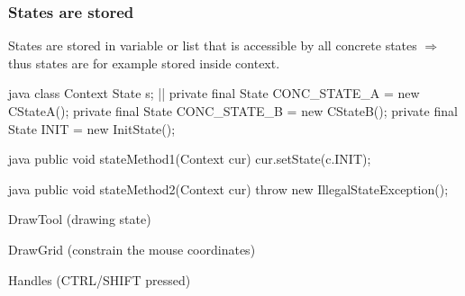 \subsubsection{States are stored}
\begin{sectionbox}\nospacing
  States are stored in variable or list that is accessible by all concrete states
  $\Rightarrow$ thus states are for example stored inside context.
\end{sectionbox}
 \begin{codebox}[Context]{java}
   class Context{
     State s;
     |\optldots|
     private final State CONC_STATE_A = new CStateA();
     private final State CONC_STATE_B = new CStateB();
     private final State INIT = new InitState();
 }
 \end{codebox} 
 \begin{codebox}{java}
   public void stateMethod1(Context cur){
     cur.setState(c.INIT);
   }
 \end{codebox} 
 \begin{codebox}{java}
   public void stateMethod2(Context cur){
     throw new IllegalStateException();
   }
 \end{codebox} 
\begin{notebox}[Examples]\nospacing
  \begin{itemizenosep}
      \item DrawTool (drawing state)
      \item DrawGrid (constrain the mouse coordinates)
      \item Handles (CTRL/SHIFT pressed)
  \end{itemizenosep}
\end{notebox}
